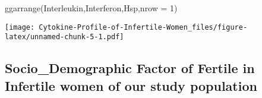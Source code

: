 \documentclass[
]{article}
\newenvironment{Shaded}{\begin{snugshade}}{\end{snugshade}}
\newcommand{\AttributeTok}[1]{\textcolor[rgb]{0.77,0.63,0.00}{#1}}
\newcommand{\DecValTok}[1]{\textcolor[rgb]{0.00,0.00,0.81}{#1}}
\newcommand{\FunctionTok}[1]{\textcolor[rgb]{0.00,0.00,0.00}{#1}}
\newcommand{\NormalTok}[1]{#1}
\begin{document}
\begin{Shaded}
\begin{Highlighting}[]
  \FunctionTok{ggarrange}\NormalTok{(Interleukin,Interferon,Hsp,}\AttributeTok{nrow =} \DecValTok{1}\NormalTok{)}
\end{Highlighting}
\end{Shaded}

\texttt{[image: Cytokine-Profile-of-Infertile-Women\_files/figure-latex/unnamed-chunk-5-1.pdf]}

\hypertarget{socio_demographic-factor-of-fertile-in-infertile-women-of-our-study-population}{%
\subsection{Socio\_Demographic Factor of Fertile in Infertile women of
our study
population}\label{socio_demographic-factor-of-fertile-in-infertile-women-of-our-study-population}}
\end{document}
